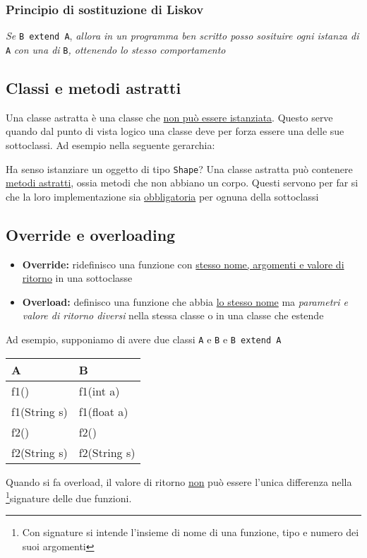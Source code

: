 \subsubsection{Principio di sostituzione di Liskov}
\textit{Se} \verb|B extend A|, \textit{allora in un programma ben scritto posso sosituire ogni istanza di} \verb|A| \textit{con una di} \verb|B|\textit{, ottenendo lo stesso comportamento}
\subsection{Classi e metodi astratti}
Una classe astratta è una classe che \underline{non può essere istanziata}. Questo serve quando dal punto di vista logico una classe deve per forza essere una delle sue sottoclassi. Ad esempio nella seguente gerarchia:
\begin{center}
\end{center}
Ha senso istanziare un oggetto di tipo \verb|Shape|?
\vskip3mm
Una classe astratta può contenere \underline{metodi astratti}, ossia metodi che non abbiano un corpo. Questi servono per far si che la loro implementazione sia \underline{obbligatoria} per ognuna della sottoclassi

\subsection{Override e overloading}
\begin{itemize}
	\item \textbf{Override:} ridefinisco una funzione con \underline{stesso nome, argomenti e valore di ritorno} in una sottoclasse
	\item \textbf{Overload:} definisco una funzione che abbia \underline{lo stesso nome} ma \textit{parametri e valore di ritorno diversi} nella stessa classe o in una classe che estende
\end{itemize}

Ad esempio, supponiamo di avere due classi \verb|A| e \verb|B| e \verb|B extend A|
\begin{center}
	\ttfamily
	\begin{tabular}{|l|l|}
		\hline
		A            & B            \\
		\hline
		f1()         & f1(int a)    \\
		f1(String s) & f1(float a)  \\
		\hline
		f2()         & f2()         \\
		f2(String s) & f2(String s) \\
		\hline
	\end{tabular}
\end{center}
Quando si fa overload, il valore di ritorno \underline{non} può essere l'unica differenza nella \footnote{Con signature si intende l'insieme di nome di una funzione, tipo e numero dei suoi argomenti}{signature} delle due funzioni.

